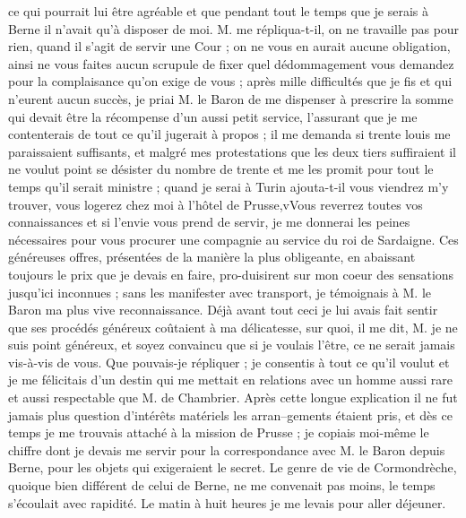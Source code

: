 \documentclass[12pt]{article}
\begin{document}
 ce qui pourrait lui être agréable et que
pendant tout le temps que je serais à Berne il n’avait qu’à disposer de moi. M. me répliqua-t-il, on
ne travaille pas pour rien, quand il s’agit de servir une Cour ; on ne vous en aurait aucune
obligation, ainsi ne vous faites aucun scrupule de fixer quel dédommagement vous demandez pour la
complaisance qu’on exige de vous ; après mille difficultés que je fis et qui n’eurent aucun succès,
je priai M. le Baron de me dispenser à prescrire la somme qui devait être la récompense d’un aussi
petit service, l’assurant que je me contenterais de tout ce qu’il jugerait à propos ; il me demanda
si trente louis me paraissaient suffisants, et malgré mes protestations que les deux tiers
suffiraient il ne voulut point se désister du nombre de trente et me les promit pour tout le temps
qu’il serait ministre ; quand je serai à Turin ajouta-t-il vous viendrez m’y trouver, vous logerez
chez moi à l’hôtel de Prusse,vVous reverrez toutes vos connaissances et si l’envie vous prend de
servir, je me donnerai les peines nécessaires pour vous procurer une compagnie au service du roi de
Sardaigne. Ces généreuses offres, présentées de la manière la plus obligeante, en abaissant toujours
le prix que je devais en faire, pro-duisirent sur mon coeur des sensations jusqu’ici inconnues ;
sans les manifester avec transport, je témoignais à M. le Baron ma plus vive reconnaissance. Déjà
avant tout ceci je lui avais fait sentir que ses procédés généreux coûtaient à ma délicatesse, sur
quoi, il me dit, M. je ne suis point généreux, et soyez convaincu que si je voulais l’être, ce ne
serait jamais vis-à-vis de vous. Que pouvais-je répliquer ; je consentis à tout ce qu’il voulut et
je me félicitais d’un destin qui me mettait en relations avec un homme aussi rare et aussi
respectable que M. de Chambrier. Après cette longue explication il ne fut jamais plus question
d’intérêts matériels les arran–gements étaient pris, et dès ce temps je me trouvais attaché à la
mission de Prusse ; je copiais moi-même le chiffre dont je devais me servir pour la correspondance
avec M. le Baron depuis Berne, pour les objets qui exigeraient le secret. Le genre de vie de
Cormondrèche, quoique bien différent de celui de Berne, ne me convenait pas moins, le temps
s’écoulait avec rapidité. Le matin à huit heures je me levais pour aller déjeuner.
\end{document}
